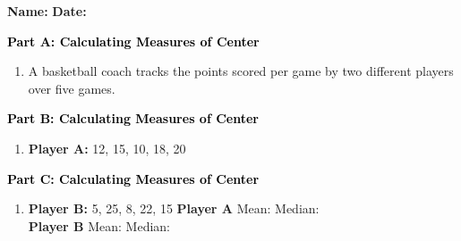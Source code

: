 \documentclass[12pt, letterpaper, fleqn]{article}
\newcommand{\blank}{\underline{\hspace{2.2cm}}}
\begin{document}
\textbf{Name:} \underline{\hspace{5cm}}
\hfill
\textbf{Date:} \underline{\hspace{3cm}}\\

\begin{tcolorbox}[colback=customteal!20]
\large\textcolor{black}{\textbf{Part A: Calculating Measures of Center}}
\end{tcolorbox}

\vspace{3mm}

\begin{enumerate}[itemsep=2.5cm, leftmargin=0.6cm]
\item A basketball coach tracks the points scored per game by two different players over five games.
\end{enumerate}

\newpage

\begin{tcolorbox}[colback=customteal!20]
\large\textcolor{black}{\textbf{Part B: Calculating Measures of Center}}
\end{tcolorbox}

\vspace{3mm}

\begin{enumerate}[itemsep=2.5cm, leftmargin=0.6cm, resume]
\item \textbf{Player A:} 12, 15, 10, 18, 20
\end{enumerate}

\newpage

\begin{tcolorbox}[colback=customteal!20]
\large\textcolor{black}{\textbf{Part C: Calculating Measures of Center}}
\end{tcolorbox}

\vspace{3mm}

\begin{enumerate}[itemsep=2.5cm, leftmargin=0.6cm, resume]
\item \textbf{Player B:} 5, 25, 8, 22, 15
\textbf{Player A} Mean: \blank \quad Median: \blank \\
\textbf{Player B} Mean: \blank \quad Median: \blank
\end{enumerate}
\end{document}
